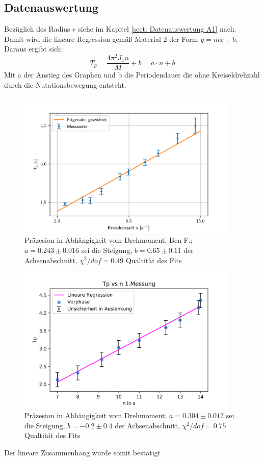 \documentclass[bibliography=totocnumbered]{scrartcl}
\begin{document}
	\subsection{Datenauswertung}
	Bezüglich des Radius $ r $ siehe im Kapitel \ref{sect: Datenauswertung A1} nach.\\
	Damit wird die lineare Regression gemäß Material 2 der Form $ y=mx+b $.
	Daraus ergibt sich:
	\begin{equation}\label{eq: Präzesion Kreisdrehzahl}
		T_{p}=\dfrac{4\pi ^{2}J_{x}n}{M}+b=a\cdot n+b
	\end{equation}
	Mit a der Anstieg des Graphen und b die Periodendauer die ohne Kreiseldrehzahl durch die Nutationsbewegung entsteht.
	\begin{figure}[!ht]
		\centering								 
		\includegraphics[width=300pt]{fotos/gpr1/A2.png}
		\caption[Präzesion in Abhängigkeit der Kreisdrehzahl]{Präzesion in Abhängigkeit vom Drehmoment, Ben F.; $ a=0.243\pm0.016 $ sei die Steigung, $ b=0.65\pm 0.11 $ der Achsenabschnitt, $ \chi^{2}/dof=0.49 $ Qualtität des Fits}							 
		\label{Abb: A2 Ben}							 
	\end{figure}


	\begin{figure}[!ht]
	\centering								 
	\includegraphics[width=300pt]{fotos/gpr1/M10_A2_S.png}
	\caption[Präzesion in Abhängigkeit der Kreisdrehzahl]{Präzesion in Abhängigkeit vom Drehmoment; $ a=0.304\pm 0.012 $ sei die Steigung, $ b= -0.2\pm 0.4$ der Achsenabschnitt, $ \chi^{2}/dof=0.75 $ Qualtität des Fits}							 
	\label{Abb: A2 Sara}							 
\end{figure}
	Der lineare Zusammenhang wurde somit bestätigt
\end{document}

